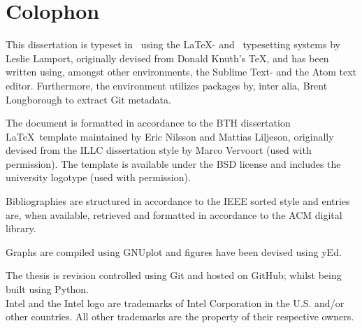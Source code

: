 
\chapter*{Colophon}
\label{cha:colophon}
This dissertation is typeset in \fonttostring\ using the \LaTeX - and \BibTeX\ typesetting systems by Leslie Lamport, originally devised from Donald Knuth's \TeX , and has been written using, amongst other environments, the Sublime Text- and the Atom text editor.
Furthermore, the environment utilizes packages by, inter alia, Brent Longborough to extract Git metadata.

The document is formatted in accordance to the BTH dissertation \LaTeX\ template maintained by Eric Nilsson and Mattias Liljeson, originally devised from the ILLC dissertation style by Marco Vervoort (used with permission).
The template is available under the BSD license and includes the university logotype (used with permission).

Bibliographies are structured in accordance to the IEEE sorted style and entries are, when available, retrieved and formatted in accordance to the ACM digital library.

Graphs are compiled using GNUplot and figures have been devised using yEd.

The thesis is revision controlled using Git and hosted on GitHub; whilst being built using Python.\\

\noindent
Intel and the Intel logo are trademarks of Intel Corporation in the U.S. and/or other countries.
All other trademarks are the property of their respective owners.






